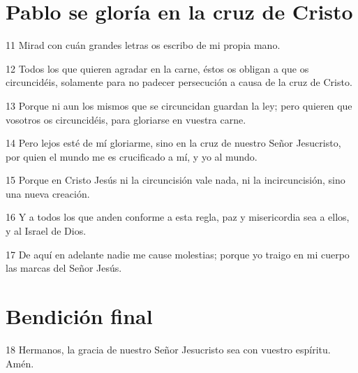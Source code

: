 \section*{Pablo se gloría en la cruz de Cristo}

\par 11 Mirad con cuán grandes letras os escribo de mi propia mano.
\par 12 Todos los que quieren agradar en la carne, éstos os obligan a que os circuncidéis, solamente para no padecer persecución a causa de la cruz de Cristo.
\par 13 Porque ni aun los mismos que se circuncidan guardan la ley; pero quieren que vosotros os circuncidéis, para gloriarse en vuestra carne.
\par 14 Pero lejos esté de mí gloriarme, sino en la cruz de nuestro Señor Jesucristo, por quien el mundo me es crucificado a mí, y yo al mundo.
\par 15 Porque en Cristo Jesús ni la circuncisión vale nada, ni la incircuncisión, sino una nueva creación.
\par 16 Y a todos los que anden conforme a esta regla, paz y misericordia sea a ellos, y al Israel de Dios.
\par 17 De aquí en adelante nadie me cause molestias; porque yo traigo en mi cuerpo las marcas del Señor Jesús.

\section*{Bendición final}

\par 18 Hermanos, la gracia de nuestro Señor Jesucristo sea con vuestro espíritu. Amén.

